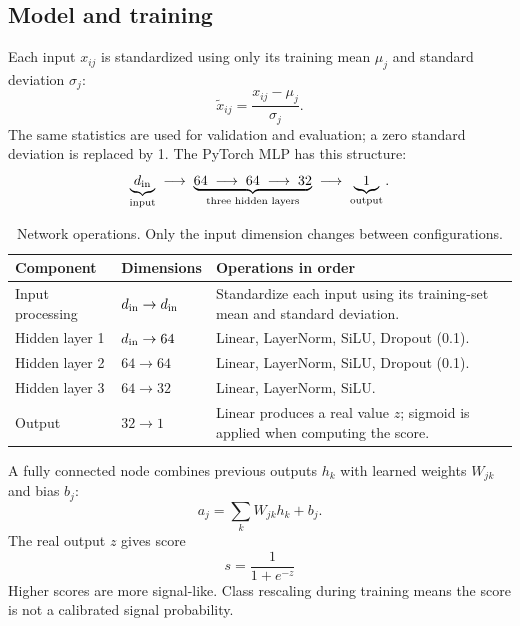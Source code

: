 \documentclass[11pt,a4paper]{article}
\begin{document}
\subsection{Model and training}\label{sec:network}
Each input $x_{ij}$ is standardized using only its training mean $\mu_j$ and standard deviation $\sigma_j$:
\[
 \widetilde x_{ij}=\frac{x_{ij}-\mu_j}{\sigma_j}.
\]
The same statistics are used for validation and evaluation; a zero standard deviation is replaced by 1.
The PyTorch MLP has this structure:
\[
 \underbrace{d_{\rm in}}_{\text{input}}
 \;\longrightarrow\;
 \underbrace{64\;\longrightarrow\;64\;\longrightarrow\;32}_{\text{three hidden layers}}
 \;\longrightarrow\;
 \underbrace{1}_{\text{output}}.
\]
\begin{table}[H]
\caption{Network operations. Only the input dimension changes between configurations.}
\label{tab:network}
\centering\small
\begin{tabularx}{\linewidth}{@{}p{.20\linewidth}p{.18\linewidth}Y@{}}
\toprule
Component & Dimensions & Operations in order \\
\midrule
Input processing & $d_{\rm in}\to d_{\rm in}$ & Standardize each input using its training-set mean and standard deviation. \\
Hidden layer 1 & $d_{\rm in}\to64$ & Linear, LayerNorm, SiLU, Dropout (0.1). \\
Hidden layer 2 & $64\to64$ & Linear, LayerNorm, SiLU, Dropout (0.1). \\
Hidden layer 3 & $64\to32$ & Linear, LayerNorm, SiLU. \\
Output & $32\to1$ & Linear produces a real value $z$; sigmoid is applied when computing the score. \\
\bottomrule
\end{tabularx}
\end{table}
A fully connected node combines previous outputs $h_k$ with learned weights $W_{jk}$ and bias $b_j$:
\[
 a_j=\sum_k W_{jk}h_k+b_j.
\]
The real output $z$ gives score
\[
 s=\frac{1}{1+e^{-z}}
\]
Higher scores are more signal-like. Class rescaling during training means the score is not a calibrated signal probability.
\end{document}
